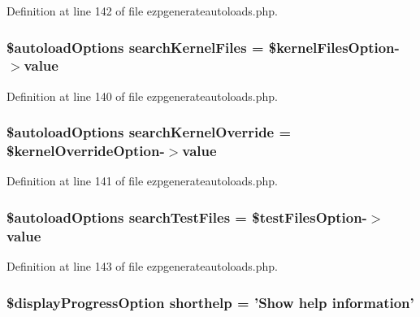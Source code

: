 Definition at line 142 of file ezpgenerateautoloads.\-php.

\hypertarget{ezpgenerateautoloads_8php_aab46cc9fff71273094aafac8ebd689d4}{
\subsubsection[{search\-Kernel\-Files}]{\setlength{\rightskip}{0pt plus 5cm}\$autoload\-Options {\bf search\-Kernel\-Files} = \$kernel\-Files\-Option-\/$>$value}}\label{ezpgenerateautoloads_8php_aab46cc9fff71273094aafac8ebd689d4}


Definition at line 140 of file ezpgenerateautoloads.\-php.

\hypertarget{ezpgenerateautoloads_8php_af86b9a19664645803f32b4d5bb872ff1}{
\subsubsection[{search\-Kernel\-Override}]{\setlength{\rightskip}{0pt plus 5cm}\$autoload\-Options {\bf search\-Kernel\-Override} = \$kernel\-Override\-Option-\/$>$value}}\label{ezpgenerateautoloads_8php_af86b9a19664645803f32b4d5bb872ff1}


Definition at line 141 of file ezpgenerateautoloads.\-php.

\hypertarget{ezpgenerateautoloads_8php_a3727c480754aa7c8b3dc7e8070ed1eb4}{
\subsubsection[{search\-Test\-Files}]{\setlength{\rightskip}{0pt plus 5cm}\$autoload\-Options {\bf search\-Test\-Files} = \$test\-Files\-Option-\/$>$value}}\label{ezpgenerateautoloads_8php_a3727c480754aa7c8b3dc7e8070ed1eb4}


Definition at line 143 of file ezpgenerateautoloads.\-php.

\hypertarget{ezpgenerateautoloads_8php_a6878132bff242d248a03a92df0ead036}{
\subsubsection[{shorthelp}]{\setlength{\rightskip}{0pt plus 5cm}\$display\-Progress\-Option {\bf shorthelp} = 'Show help information'}}\label{ezpgenerateautoloads_8php_a6878132bff242d248a03a92df0ead036}


